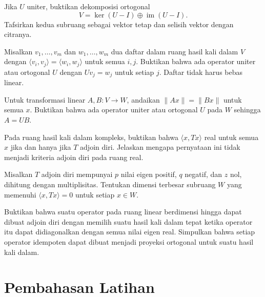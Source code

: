 \begin{latihan}\label{op:lat-titik-tetap}
    Jika $U$ uniter, buktikan dekomposisi ortogonal
    \[
        V=\ker(U-I)\oplus\operatorname{im}(U-I).
    \]
    Tafsirkan kedua subruang sebagai vektor tetap dan selisih
    vektor dengan citranya.
\end{latihan}

\begin{latihan}\label{op:lat-gram-sama}
    Misalkan $v_1,\ldots,v_m$ dan $w_1,\ldots,w_m$ dua daftar
    dalam ruang hasil kali dalam $V$ dengan
    $\langle v_i,v_j\rangle=\langle w_i,w_j\rangle$ untuk semua $i,j$.
    Buktikan bahwa ada operator uniter atau ortogonal $U$ dengan
    $Uv_j=w_j$ untuk setiap $j$. Daftar tidak harus bebas linear.
\end{latihan}

\begin{latihan}\label{op:lat-norma-sama}
    Untuk transformasi linear $A,B:V\to W$, andaikan
    $\|Ax\|=\|Bx\|$ untuk semua $x$.
    Buktikan bahwa ada operator uniter atau ortogonal $U$ pada $W$
    sehingga $A=UB$.
\end{latihan}

\begin{latihan}\label{op:lat-kuadratik-real}
    Pada ruang hasil kali dalam kompleks, buktikan bahwa
    $\langle x,Tx\rangle$ real untuk semua $x$ jika dan hanya jika
    $T$ adjoin diri. Jelaskan mengapa pernyataan ini tidak menjadi
    kriteria adjoin diri pada ruang real.
\end{latihan}

\begin{latihan}\label{op:lat-isotropik}
    Misalkan $T$ adjoin diri mempunyai $p$ nilai eigen positif,
    $q$ negatif, dan $z$ nol, dihitung dengan multiplisitas.
    Tentukan dimensi terbesar subruang $W$ yang memenuhi
    $\langle x,Tx\rangle=0$ untuk setiap $x\in W$.
\end{latihan}

\begin{latihan}\label{op:lat-pilih-metrik}
    Buktikan bahwa suatu operator pada ruang linear berdimensi
    hingga dapat dibuat adjoin diri dengan memilih suatu hasil
    kali dalam tepat ketika operator itu dapat didiagonalkan
    dengan semua nilai eigen real.
    Simpulkan bahwa setiap operator idempoten dapat dibuat
    menjadi proyeksi ortogonal untuk suatu hasil kali dalam.
\end{latihan}

\ifpembahasan
\section{Pembahasan Latihan}

